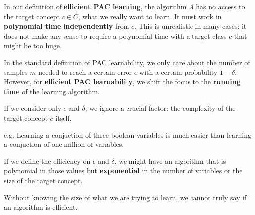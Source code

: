 In our definition of \textbf{efficient PAC learning}, the algorithm $A$ has no access to the target concept $c \in C$, what we really want to learn.
It must work in \textbf{polynomial time independently} from $c$. This is unrealistic in many cases: it does not make any sense to require a polynomial time 
with a target class $c$ that might be too huge. \vspace{7pt}

In the standard definition of PAC learnability, we only care about the number of samples $m$ needed to reach a certain error $\epsilon$ with a certain probability 
$1 - \delta$. However, for \textbf{efficient PAC learnability}, we shift the focus to the \textbf{running time} of the learning algorithm. \vspace{7pt}

If we consider only $\epsilon$ and $\delta$, we ignore a crucial factor: the complexity of the target concept $c$ itself.
\begin{example}
    e.g. Learning a conjuction of three boolean variables is much easier than learning a conjuction of one million of variables. \vspace{7pt}

    If we define the efficiency on $\epsilon$ and $\delta$, we might have an algorithm that is polynomial in those values but \textbf{exponential} in the 
    number of variables or the size of the target concept.
\end{example}
Without knowing the size of what we are trying to learn, we cannot truly say if an algorithm is efficient.

